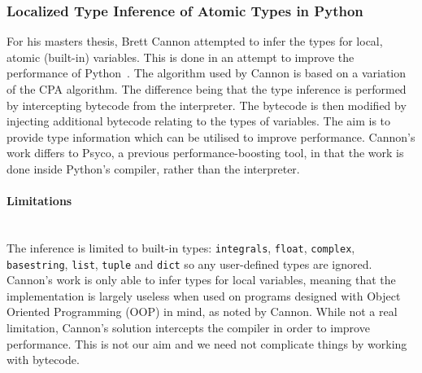 \documentclass[12pt, titlepage]{article}
\begin{document}
\subsubsection{Localized Type Inference of Atomic Types in Python}
For his masters thesis, Brett Cannon attempted to infer the types for local, atomic (built-in) variables. This is done in an attempt to improve the performance of Python~\cite{cannonlocalizedtype}. The algorithm used by Cannon is based on a variation of the CPA algorithm. The difference being that the type inference is performed by intercepting bytecode from the interpreter. The bytecode is then modified by injecting additional bytecode relating to the types of variables. The aim is to provide type information which can be utilised to improve performance. Cannon's work differs to Psyco, a previous performance-boosting tool, in that the work is done inside Python's compiler, rather than the interpreter.
\paragraph{Limitations}\mbox{}\\
The inference is limited to built-in types: \texttt{integrals}, \texttt{float}, \texttt{complex}, \texttt{basestring}, \texttt{list}, \texttt{tuple} and \texttt{dict} so any user-defined types are ignored. \\
\indent Cannon's work is only able to infer types for local variables, meaning that the implementation is largely useless when used on programs designed with Object Oriented Programming (OOP) in mind, as noted by Cannon. While not a real limitation, Cannon's solution intercepts the compiler in order to improve performance. This is not our aim and we need not complicate things by working with bytecode.

\end{document}
